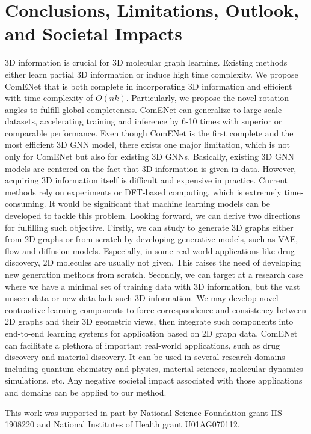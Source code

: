 \documentclass{article}
\begin{document}
\section{Conclusions, Limitations, Outlook, and Societal Impacts}
3D information is crucial for 3D molecular graph learning.
Existing methods either learn partial 3D information or induce high time complexity.
We propose ComENet that is both complete in incorporating 3D information and efficient 
with time complexity of $O(nk)$.
Particularly, we propose the novel rotation angles to fulfill global completeness.
ComENet can generalize to large-scale datasets,
accelerating training and inference by 6-10 times with superior or comparable performance.
\textcolor{COLOR}{Even though ComENet is the first complete and the most efficient 3D GNN model, there exists one major limitation, which is not only for
ComENet but also for existing 3D GNNs. Basically, existing 3D GNN models
are centered on the fact that 3D information is given in data.
However, acquiring 3D information itself is difficult and expensive in practice.
Current methods rely on experiments or
DFT-based computing, which is extremely time-consuming. 
It would be significant that machine
learning models can be developed to tackle this problem.
Looking forward, we can derive two directions for fulfilling such objective.
Firstly, we can study to generate 3D graphs either from 2D graphs or from scratch by developing generative models,
such as VAE, flow and diffusion models.
Especially, in some real-world applications like drug discovery, 2D molecules are usually not given.
This raises the need of developing new generation methods from scratch.
Secondly, we can target at a research case where we have a minimal set of training data with
3D information, but the vast unseen data or new data lack such 3D information.
We may develop novel contrastive learning components to force correspondence and consistency 
between 2D graphs and their 3D geometric views,
then integrate such components into end-to-end learning systems for
application based on 2D graph data.
ComENet can facilitate a plethora of important real-world applications, such as drug discovery and material discovery.
It can be used in several research domains including quantum chemistry and physics, material sciences, molecular dynamics simulations, etc.
Any negative societal impact associated with those applications and domains can be applied to our method.}

\begin{ack}
This work was supported in part by National Science Foundation grant IIS-1908220 and National Institutes of Health grant U01AG070112.
\end{ack}
\end{document}
